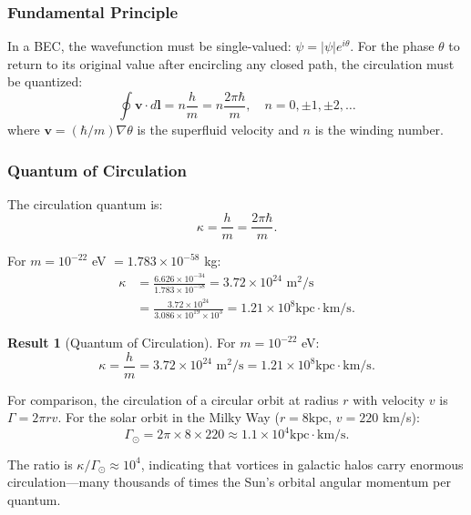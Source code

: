 \documentclass[11pt,a4paper]{article}
\newcommand{\kpc}{\ensuremath{\mathrm{kpc}}}
\theoremstyle{definition}
\newtheorem{result}{Result}[section]
\theoremstyle{remark}
\begin{document}
\subsubsection{Fundamental Principle}

In a BEC, the wavefunction must be single-valued: $\psi = |\psi|e^{i\theta}$. For the phase $\theta$ to return to its original value after encircling any closed path, the circulation must be quantized:
\begin{equation}
\label{eq:circulation}
\boxed{\oint \mathbf{v} \cdot d\mathbf{l} = n \frac{h}{m} = n \frac{2\pi\hbar}{m}, \quad n = 0, \pm1, \pm2, \ldots}
\end{equation}
where $\mathbf{v} = (\hbar/m)\nabla\theta$ is the superfluid velocity and $n$ is the winding number.

\subsubsection{Quantum of Circulation}

The circulation quantum is:
\begin{equation}
\kappa = \frac{h}{m} = \frac{2\pi\hbar}{m}.
\end{equation}

For $m = 10^{-22}$ eV $= 1.783 \times 10^{-58}$ kg:
\begin{align}
\kappa &= \frac{6.626 \times 10^{-34}}{1.783 \times 10^{-58}} = 3.72 \times 10^{24} \text{ m}^2/\text{s} \\
&= \frac{3.72 \times 10^{24}}{3.086 \times 10^{19} \times 10^3} = 1.21 \times 10^{8} \kpc \cdot \text{km/s}.
\end{align}

\begin{result}[Quantum of Circulation]
For $m = 10^{-22}$ eV:
\begin{equation}
\boxed{\kappa = \frac{h}{m} = 3.72 \times 10^{24} \text{ m}^2/\text{s} = 1.21 \times 10^8 \kpc \cdot \text{km/s}.}
\end{equation}

For comparison, the circulation of a circular orbit at radius $r$ with velocity $v$ is $\Gamma = 2\pi r v$. For the solar orbit in the Milky Way ($r = 8 \kpc$, $v = 220$ km/s):
\begin{equation}
\Gamma_\odot = 2\pi \times 8 \times 220 \approx 1.1 \times 10^4 \kpc \cdot \text{km/s}.
\end{equation}

The ratio is $\kappa/\Gamma_\odot \approx 10^4$, indicating that vortices in galactic halos carry enormous circulation---many thousands of times the Sun's orbital angular momentum per quantum.
\end{result}
\end{document}
